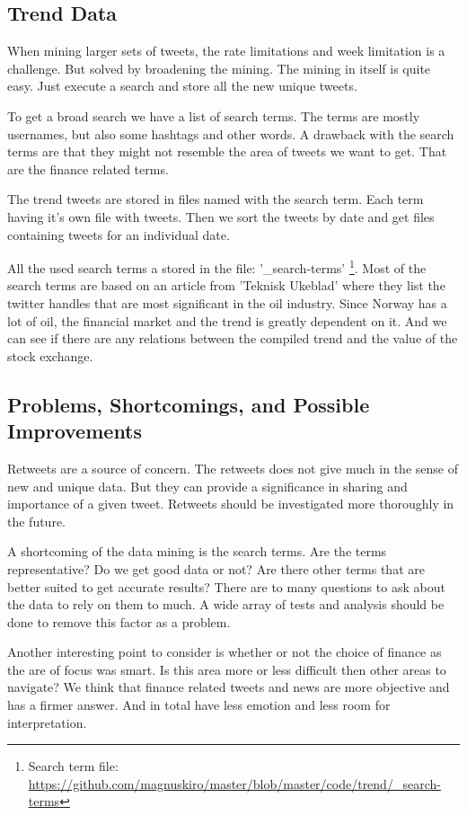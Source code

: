 \subsection{Trend Data}
When mining larger sets of tweets, the rate limitations and week limitation is
a challenge. But solved by broadening the mining. The mining in itself is quite
easy. Just execute a search and store all the new unique tweets. 

To get a broad search we have a list of search terms. The terms are mostly
usernames, but also some hashtags and other words. A drawback with the search
terms are that they might not resemble the area of tweets we want to get. That
are the finance related terms. 

The trend tweets are stored in files named with the search term. Each term
having it's own file with tweets. Then we sort the tweets by date and get files
containing tweets for an individual date.

All the used search terms a stored in the file: '\_search-terms'
\footnote{Search term file:
\url{https://github.com/magnuskiro/master/blob/master/code/trend/_search-terms}}.
Most of the search terms are based on an article from 'Teknisk Ukeblad' where
they list the twitter handles that are most significant in the oil industry.
Since Norway has a lot of oil, the financial market and the trend is greatly
dependent on it. And we can see if there are any relations between the compiled
trend and the value of the stock exchange.  

\subsection{Problems, Shortcomings, and Possible Improvements}
Retweets are a source of concern. The retweets does not give much in the sense
of new and unique data. But they can provide a significance in sharing and
importance of a given tweet. Retweets should be investigated more thoroughly in
the future.  

A shortcoming of the data mining is the search terms. Are the terms
representative? Do we get good data or not? Are there other terms that are
better suited to get accurate results? There are to many questions to ask about
the data to rely on them to much. A wide array of tests and analysis should be
done to remove this factor as a problem. 

Another interesting point to consider is whether or not the choice of finance
as the are of focus was smart. Is this area more or less difficult then other
areas to navigate? We think that finance related tweets and news are more
objective and has a firmer answer. And in total have less emotion and less room
for interpretation.
%

